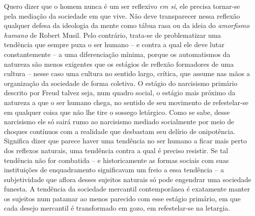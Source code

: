 Quero dizer que o homem nunca é um ser reflexivo \emph{em si}, ele
precisa tornar-se pela mediação da sociedade em que vive. Não deve
transparecer nessa reflexão qualquer defesa da ideologia da mente como
tábua rasa ou da ideia do \emph{amorfismo humano} de Robert Musil. Pelo
contrário, trata-se de problematizar uma tendência que sempre puxa o ser
humano -- e contra a qual ele deve lutar constantemente -- a uma
diferenciação mínima, porque os automatismos da natureza são menos
exigentes que os estágios de reflexão formadores de uma cultura -- nesse
caso uma cultura no sentido largo, crítica, que assume nas mãos a
organização da sociedade de forma coletiva\emph{.} O estágio do
narcisismo primário descrito por Freud talvez seja, num quadro social, o
estágio mais próximo da natureza a que o ser humano chega, no sentido de
seu movimento de refestelar-se em qualquer coisa que não lhe tire o
sossego letárgico. Como se sabe, desse narcisismo ele só sairá rumo ao
narcisismo mediado socialmente por meio de choques contínuos com a
realidade que desbastam seu delírio de onipotência. Significa dizer que
parece haver uma tendência no ser humano a ficar mais perto dos reflexos
naturais, uma tendência contra a qual é preciso resistir. Se tal
tendência não for combatida -- e historicamente as formas sociais com
suas instituições de enquadramento significavam um freio a essa
tendência -- a subjetividade que aflora desses sujeitos naturais só pode
engendrar uma sociedade funesta. A tendência da sociedade mercantil
contemporânea é exatamente manter os sujeitos num patamar ao menos
parecido com esse estágio primário, em que cada desejo mercantil é
transformado em gozo, em refestelar-se na letargia.

